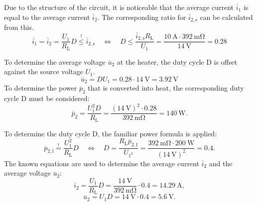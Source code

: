 \begin{solutionblock}
    Due to the structure of the circuit, it is noticeable that the average current $\overline i_1$ is equal to the average current $\overline i_2$. The corresponding ratio for $\overline i_{2,\mathrm{s}}$ can be calculated from this.
    \begin{equation}
            \overline i_1 = \overline i_2 = \frac{U_1}{R_{\mathrm{L}}}  D \overset ! \leq {\overline i_{\mathrm{2,s}}} \quad \Leftrightarrow \quad  D \leq \frac{{\overline i_{\mathrm{2,s}}}  R_{\mathrm{L}}}{U_1} = \frac{\SI{10}{\ampere} \cdot {\SI{392}{\milli\ohm}}}{\SI{14}{\volt}} = 0.28
    \end{equation}
    
    To determine the average voltage $\overline u_2$ at the heater, the duty cycle D is offset against the source voltage $U_1$.
    \begin{equation}
        \overline u_2 = D  U_1 = 0.28 \cdot \SI{14}{\volt} = \SI{3.92}{\volt}
    \end{equation}
    To determine the power $\overline{p}_{2}$ that is converted into heat, the corresponding duty cycle D must be considered:
     \begin{equation}
        \overline{p}_{\mathrm{2}} = \frac{U_1^2 D}{ R_{\mathrm{L}}} = \frac{(\SI{14}{\volt})^2 \cdot 0.28}{\SI{392}{\milli\ohm}}= \SI{140}{\watt}.   
    \end{equation}
\end{solutionblock}


\begin{solutionblock}
To determine the duty cycle D, the familiar power formula is applied:
\begin{equation}
    \overline{p}_{\mathrm{2,f}} \overset ! = \frac{U_\mathrm{1}^2}{ R_{\mathrm{L}}} D \quad 
    \Leftrightarrow \quad D = \frac{ R_{\mathrm{L}}  \overline{p}_{\mathrm{2,f}}}{U_\mathrm{1^2}} = \frac{\SI{392}{\milli\ohm} \cdot \SI{200}{\watt}}{(\SI{14}{\volt})^2} = 0.4.
\end{equation}
The known equations are used to determine the average current $\overline i_\mathrm{2}$ and the average voltage $\overline u_\mathrm{2}$:
\begin{equation}
    \overline i_\mathrm{2} = \frac{U_\mathrm{1}}{ R_{\mathrm{L}}} D = \frac{\SI{14}{\volt}}{\SI{392}{\milli\ohm}} \cdot 0.4 = \SI{14.29}{\ampere},
\end{equation}
\begin{equation}
 \overline u_\mathrm{2} = U_\mathrm{1} D = {\SI{14}{\volt}} \cdot 0.4 = \SI{5.6}{\volt}.
\end{equation}
\end{solutionblock}

